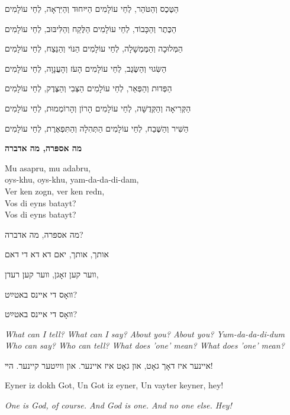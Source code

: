 הַטֶּכֶס וְהַטֹּהַר, לְחַי עוֹלָמִים
\hfill
הַיּיִחוּד וְהַיִּרְאָה, לְחַי עוֹלָמִים

הַכֶּתֶר וְהַכָּבוֹד, לְחַי עוֹלָמִים
\hfill
הַלֶּקַח וְהַלִּיבּוּב, לְחַי עוֹלָמִים

הַמְּלוּכָה וְהַמֶּמְשָׁלָה, לְחַי עוֹלָמִים
\hfill
הַנּוֹי וְהַנֵּצַח, לְחַי עוֹלָמִים

הַשִּׂגוּי וְהַשֶּׂגֶב, לְחַי עוֹלָמִים
\hfill
הָעֹז וְהָעֲנָוָה, לְחַי עוֹלָמִים

הַפְּדוּת וְהַפְּאֵר, לְחַי עוֹלָמִים
\hfill
הַצְּבִי וְהַצֶּדֶק, לְחַי עוֹלָמִים

הַקְּרִיאָה וְהַקְּדֻשָּׁה, לְחַי עוֹלָמִים
\hfill
הָרוֹן וְהָרוֹמְמוּת, לְחַי עוֹלָמִים

הַשִּׁיר וְהַשֶּׁבַח, לְחַי עוֹלָמִים
\hfill
הַתְּהִלָה וְהַתִּפְאֶרֶת, לְחַי עוֹלָמִים

\break
\begin{center}
{\large \bfseries
מה אספּרה, מה אדברה
}
\end{center}

\begin{minipage}{0.52\linewidth}
\begin{english}
Mu asapru, mu adabru, \\
oys-khu, oys-khu, yam-da-da-di-dam, \\
Ver ken zogn, ver ken redn, \\
Vos di eyns batayt? \\
Vos di eyns batayt?
\end{english}
\end{minipage} \hspace{0.02\linewidth}
\begin{minipage}{0.44\linewidth}
מה אספּרה, מה אדברה?

אותך, אותך, יאם דא דא די דאם

ווער קען זאָגן, ווער קען רעדן, 

וואָס די איינס באטײַט?

וואָס די איינס באטײַט?
\end{minipage}

\vspace{1em}

\begin{english}
{\itshape
What can I tell? 
What can I say?
About you? About you?
Yum-da-da-di-dum \\
Who can say? 
Who can tell?
What does 'one' mean?
What does 'one' mean?}
\end{english}

\begin{center}
איינער איז דאָך גאָט,
און גאָט איז איינער. 
און ווײַטער קיינער. הײ!

\begin{english}
Eyner iz dokh Got,
Un Got iz eyner,
Un vayter keyner, hey!

{\itshape One is God, of course. 
And God is one. 
And no one else. Hey!}
\end{english}
\end{center}

